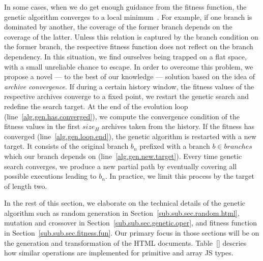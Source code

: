 \documentclass[sigconf]{acmart}
\begin{document}
In some cases, when we do get enough guidance from the fitness function, the genetic algorithm converges to a local minimum~\cite{ga.flag.problem.or.survey}. For example, if one branch is dominated by another, the coverage of the former branch depends on the coverage of the latter. Unless this relation is captured by the branch condition on the former branch, the respective fitness function does not reflect on the branch dependency. In this situation, we find ourselves being trapped on a flat space, with a small unreliable chance to escape. In order to overcome this problem, we propose a novel --- to the best of our knowledge --- solution based on the idea of \emph{archive convergence}. If during a certain history window, the fitness values of the respective archives converge to a fixed point, we restart the genetic search and redefine the search target. At the end of the evolution loop (line~\ref{alg.gen.has.converged}), we compute the convergence condition of the fitness values in the first $size_H$ archives taken from the history. If the fitness has converged (line~\ref{alg.gen.loop.end}), the genetic algorithm is restarted with a new target. It consists of the original branch $b_n$ prefixed with a branch $b \in branches$ which our branch depends on (line~\ref{alg.gen.new.target}). Every time genetic search converges, we produce a new partial path by eventually covering all possible executions leading to $b_n$. In practice, we limit this process by the target of length two.

In the rest of this section, we elaborate on the technical details of the genetic algorithm such as random generation in Section~\ref{sub.sub.sec.random.html}, mutation and crossover in Section~\ref{sub.sub.sec.genetic.oper}, and fitness function in Section~\ref{sub.sub.sec.fitness.fun}. Our primary focus in those sections will be on the generation and transformation of the HTML documents. Table~\ref{} descries how similar operations are implemented for primitive and array JS types. 
\end{document}
